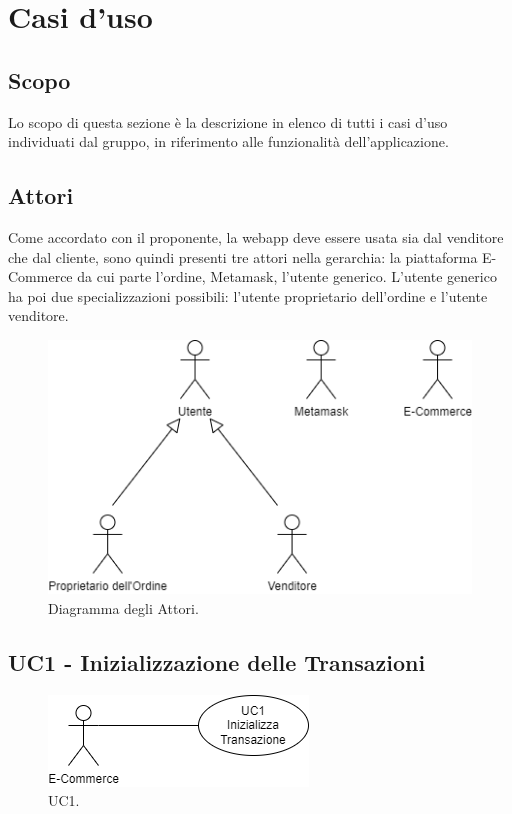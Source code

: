 \section{Casi d'uso} \label{section:casi_uso}

\subsection{Scopo}
Lo scopo di questa sezione è la descrizione in elenco di tutti i casi d'uso individuati dal gruppo, in
riferimento alle funzionalità dell'applicazione.

\subsection{Attori}
Come accordato con il proponente, la webapp deve essere usata sia dal venditore che dal cliente,
sono quindi presenti tre attori nella gerarchia: la piattaforma E-Commerce da cui parte l'ordine, Metamask\glo{}, l'utente generico.
L'utente generico ha poi due specializzazioni possibili: l'utente proprietario dell'ordine e l'utente venditore.

\begin{figure}[H]
    \centering
    \includegraphics[scale=0.7]{immagini/UseCases-Attori.png}
    \caption{Diagramma degli Attori.}
  \end{figure}

\subsection{UC1 - Inizializzazione delle Transazioni}

\begin{figure}[H]
    \centering
    \includegraphics[scale=0.7]{immagini/UseCases-UC1.png}
    \caption{UC1.}
  \end{figure}

